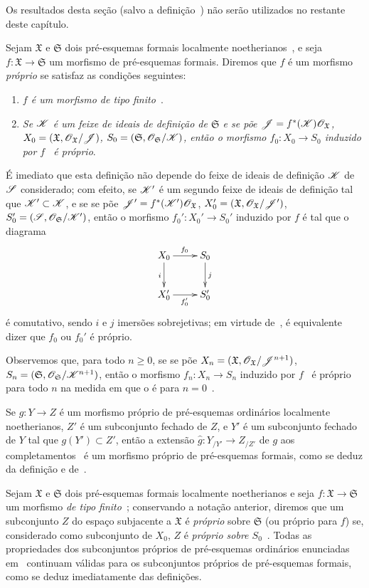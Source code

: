 Os resultados desta seção (salvo a definição~) não serão utilizados no restante deste capítulo.

\begin{env}[3.4.1]
\label{III.3.4.1}
Sejam $\mathfrak{X}$ e $\mathfrak{S}$ dois pré-esquemas formais localmente noetherianos~, e seja $f:\mathfrak{X}\to\mathfrak{S}$ um morfismo de pré-esquemas formais.
Diremos que $f$ é um morfismo \emph{próprio} se satisfaz as condições seguintes:
\begin{enumerate}
  \item[1.º] \emph{$f$ é um morfismo de tipo finito~}.
  \item[2.º] \emph{Se $\mathscr{K}$ é um feixe de ideais de definição de $\mathfrak{S}$ e se põe $\mathscr{J}=f^*(\mathscr{K})\mathscr{O}_\mathfrak{X}$, $X_0=(\mathfrak{X},\mathscr{O}_\mathfrak{X}/\mathscr{J})$, $S_0=(\mathfrak{S},\mathscr{O}_\mathfrak{S}/\mathscr{K})$, então o morfismo $f_0:X_0\to S_0$ induzido por $f$~ é próprio}.
\end{enumerate}
É imediato que esta definição não depende do feixe de ideais de definição $\mathscr{K}$ de $\mathscr{S}$ considerado; com efeito, se $\mathscr{K}'$ é um segundo feixe de ideais de definição tal que $\mathscr{K}'\subset\mathscr{K}$, e se se põe $\mathscr{J}'=f^*(\mathscr{K}')\mathscr{O}_\mathfrak{X}$, $X_0'=(\mathfrak{X},\mathscr{O}_\mathfrak{X}/\mathscr{J}')$, $S_0'=(\mathscr{S},\mathscr{O}_\mathfrak{S}/\mathscr{K}')$, então o morfismo $f_0':X_0'\to S_0'$ induzido por $f$ é tal que o diagrama
\[
  \xymatrix{
    X_0\ar[r]^{f_0}\ar[d]_i &
    S_0\ar[d]^j\\
    X_0'\ar[r]_{f_0'} &
    S_0'
  }
\]
é comutativo, sendo $i$ e $j$ imersões sobrejetivas; em virtude de~, é equivalente dizer que $f_0$ ou $f_0'$ é próprio.

Observemos que, para todo $n\geq 0$, se se põe $X_n=(\mathfrak{X},\mathscr{O}_\mathfrak{X}/\mathscr{J}^{n+1})$, $S_n=(\mathfrak{S},\mathscr{O}_\mathfrak{S}/\mathscr{K}^{n+1})$, então o morfismo $f_n:X_n\to S_n$ induzido por $f$~ é próprio para todo $n$ na medida em que o é para $n=0$~.

Se $g:Y\to Z$ é um morfismo próprio de pré-esquemas ordinários localmente noetherianos, $Z'$ é um subconjunto fechado de $Z$, e $Y'$ é um subconjunto fechado de $Y$ tal que $g(Y')\subset Z'$, então a extensão $\widehat{g}:Y_{/Y'}\to Z_{/Z'}$ de $g$ aos completamentos~ é um morfismo próprio de pré-esquemas formais, como se deduz da definição e de~.

Sejam $\mathfrak{X}$ e $\mathfrak{S}$ dois pré-esquemas formais localmente noetherianos e seja $f:\mathfrak{X}\to\mathfrak{S}$ um morfismo \emph{de tipo finito}~; conservando a notação anterior, diremos que um subconjunto $Z$ do espaço subjacente a $\mathfrak{X}$ é \emph{próprio} sobre $\mathfrak{S}$ (ou próprio para $f$) se, considerado como subconjunto de $X_0$, $Z$ é \emph{próprio sobre $S_0$}~.
Todas as propriedades dos subconjuntos próprios de pré-esquemas ordinários enunciadas em~ continuam válidas para os subconjuntos próprios de pré-esquemas formais, como se deduz imediatamente das definições.
\end{env}

